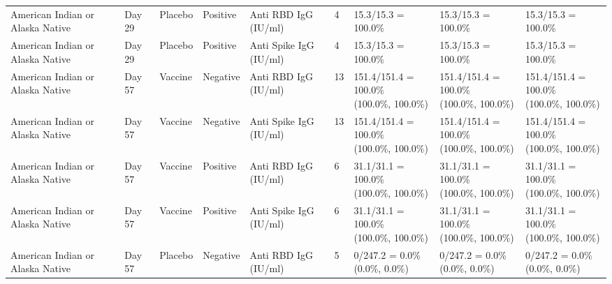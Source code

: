 \documentclass[]{book}
\theoremstyle{definition}
\theoremstyle{definition}
\theoremstyle{definition}
\newcommand{\1}{\mathbbm{1}}
\begin{document}
\begin{landscape}
\begin{ThreePartTable}
\begin{longtable}[t]{>{\raggedright\arraybackslash}p{2.7cm}llllllll}
\hspace{1em}American Indian or Alaska Native & Day 29 & Placebo & Positive & Anti RBD IgG (IU/ml) & 4 & 15.3/15.3 = 100.0\% & 15.3/15.3 = 100.0\% & 15.3/15.3 = 100.0\%\\
\hspace{1em}American Indian or Alaska Native & Day 29 & Placebo & Positive & Anti Spike IgG (IU/ml) & 4 & 15.3/15.3 = 100.0\% & 15.3/15.3 = 100.0\% & 15.3/15.3 = 100.0\%\\
\hspace{1em}American Indian or Alaska Native & Day 57 & Vaccine & Negative & Anti RBD IgG (IU/ml) & 13 & \makecell[l]{151.4/151.4 = 100.0\%\\(100.0\%, 100.0\%)} & \makecell[l]{151.4/151.4 = 100.0\%\\(100.0\%, 100.0\%)} & \makecell[l]{151.4/151.4 = 100.0\%\\(100.0\%, 100.0\%)}\\
\hspace{1em}American Indian or Alaska Native & Day 57 & Vaccine & Negative & Anti Spike IgG (IU/ml) & 13 & \makecell[l]{151.4/151.4 = 100.0\%\\(100.0\%, 100.0\%)} & \makecell[l]{151.4/151.4 = 100.0\%\\(100.0\%, 100.0\%)} & \makecell[l]{151.4/151.4 = 100.0\%\\(100.0\%, 100.0\%)}\\
\hspace{1em}American Indian or Alaska Native & Day 57 & Vaccine & Positive & Anti RBD IgG (IU/ml) & 6 & \makecell[l]{31.1/31.1 = 100.0\%\\(100.0\%, 100.0\%)} & \makecell[l]{31.1/31.1 = 100.0\%\\(100.0\%, 100.0\%)} & \makecell[l]{31.1/31.1 = 100.0\%\\(100.0\%, 100.0\%)}\\
\hspace{1em}American Indian or Alaska Native & Day 57 & Vaccine & Positive & Anti Spike IgG (IU/ml) & 6 & \makecell[l]{31.1/31.1 = 100.0\%\\(100.0\%, 100.0\%)} & \makecell[l]{31.1/31.1 = 100.0\%\\(100.0\%, 100.0\%)} & \makecell[l]{31.1/31.1 = 100.0\%\\(100.0\%, 100.0\%)}\\
\hspace{1em}American Indian or Alaska Native & Day 57 & Placebo & Negative & Anti RBD IgG (IU/ml) & 5 & \makecell[l]{0/247.2 = 0.0\%\\(0.0\%, 0.0\%)} & \makecell[l]{0/247.2 = 0.0\%\\(0.0\%, 0.0\%)} & \makecell[l]{0/247.2 = 0.0\%\\(0.0\%, 0.0\%)}\\

\end{longtable}
\end{ThreePartTable}
\end{landscape}
\end{document}
